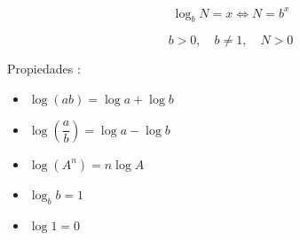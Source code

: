 \documentclass[12pt, a5paper]{article}
\begin{document}
$$
\log_{b} N = x \Longleftrightarrow N = b^x
$$

$$
b > 0,\quad b \ne 1,\quad N > 0
$$

Propiedades :
\begin{itemize}
\item{$\log(ab) = \log a + \log b$}
\item{$\log(\dfrac{a}{b}) = \log a - \log b$}
\item{$\log(A^n) = n \log A$}
\item{$\log_{b} b = 1$}
\item{$\log 1 = 0$}
\end{itemize}
\end{document}
